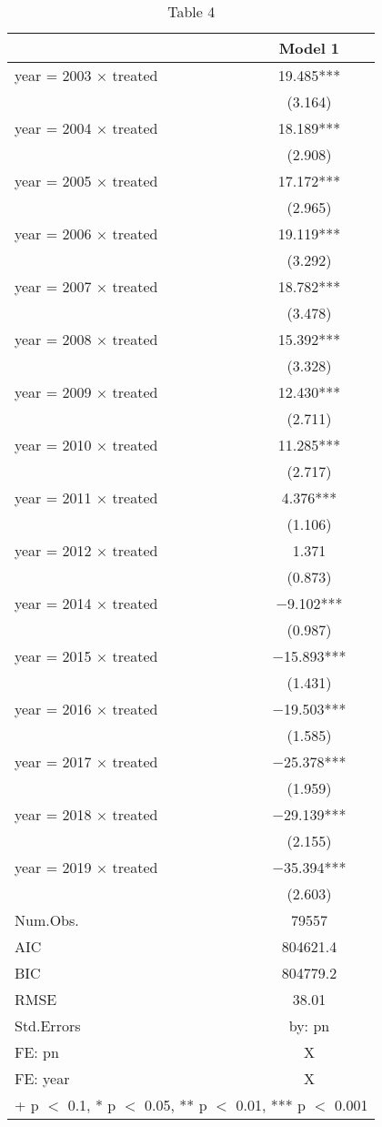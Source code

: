 \begin{table}

\caption{Table 4}
\centering
\begin{tabular}[t]{lc}
\toprule
  & Model 1\\
\midrule
year = 2003 × treated & \num{19.485}***\\
 & (\num{3.164})\\
year = 2004 × treated & \num{18.189}***\\
 & (\num{2.908})\\
year = 2005 × treated & \num{17.172}***\\
 & (\num{2.965})\\
year = 2006 × treated & \num{19.119}***\\
 & (\num{3.292})\\
year = 2007 × treated & \num{18.782}***\\
 & (\num{3.478})\\
year = 2008 × treated & \num{15.392}***\\
 & (\num{3.328})\\
year = 2009 × treated & \num{12.430}***\\
 & (\num{2.711})\\
year = 2010 × treated & \num{11.285}***\\
 & (\num{2.717})\\
year = 2011 × treated & \num{4.376}***\\
 & (\num{1.106})\\
year = 2012 × treated & \num{1.371}\\
 & (\num{0.873})\\
year = 2014 × treated & \num{-9.102}***\\
 & (\num{0.987})\\
year = 2015 × treated & \num{-15.893}***\\
 & (\num{1.431})\\
year = 2016 × treated & \num{-19.503}***\\
 & (\num{1.585})\\
year = 2017 × treated & \num{-25.378}***\\
 & (\num{1.959})\\
year = 2018 × treated & \num{-29.139}***\\
 & (\num{2.155})\\
year = 2019 × treated & \num{-35.394}***\\
 & (\num{2.603})\\
\midrule
Num.Obs. & \num{79557}\\
AIC & \num{804621.4}\\
BIC & \num{804779.2}\\
RMSE & \num{38.01}\\
Std.Errors & by: pn\\
FE: pn & X\\
FE: year & X\\
\bottomrule
\multicolumn{2}{l}{\rule{0pt}{1em}+ p $<$ 0.1, * p $<$ 0.05, ** p $<$ 0.01, *** p $<$ 0.001}\\
\end{tabular}
\end{table}
